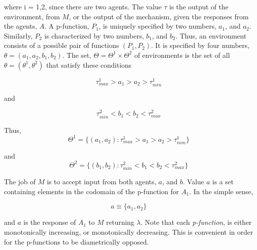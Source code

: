\documentclass[10pt, titlepage, twocolumn]{report}
\begin{document}
\begin{equation}
[\tau^i_{min}, \tau^i_{max}]
\end{equation}

where i = 1,2, since there are two agents. The value \( \tau \) is the output of the environment, from \( M \), or the output of the mechanism, given the responses from the agents, \( A \). A p-function, \(P_1\), is uniquely specified by two numbers, \( a_1 \), and \( a_2 \). Similarly, \( P_2 \) is characterized by two numbers, \( b_1 \), and \( b_2 \). Thus, an environment consists of a possible pair of functions \( (P_1, P_2) \). It is specified by four numbers, \( \theta = (a_1, a_2, b_1, b_2) \). The set, \( \Theta = \Theta^1 \times \Theta^2 \) of environments is the set of all \( \theta = (\theta^1, \theta^2) \) that satisfy these conditions


\begin{equation}
\tau^1_{max} > a_1 > a_2 > \tau^1_{min}
\end{equation}

and

\begin{equation}
\tau^2_{min} < b_1 < b_2 < \tau^2_{max}
\end{equation}

Thus, 
\begin{equation}
\Theta^1 = \{  (a_1, a_2) : \tau^1_{max} > a_1 > a_2 > \tau^1_{min} \}
\end{equation}

and 
\begin{equation}
\Theta^2 = \{  (b_1, b_2) : \tau^2_{min} < b_1 < b_2 < \tau^2_{max} \}
\end{equation}

\hspace*{15pt}
The job of \(M\) is to accept input from both agents, \(a\), and \(b\). Value \(a\) is a set containing elements in the codomain of the p-function for \(A_1\). In the simple sense,

\begin{equation}
a \equiv \{a_1, a_2\}
\end{equation}

and \(a\) is the response of \(A_1\) to \(M\) returning \(\lambda\). Note that each \textit{p-function}, is either monotonically increasing, or monotonically decreasing. This is convenient in order for the p-functions to be diametrically opposed.
\end{document}
